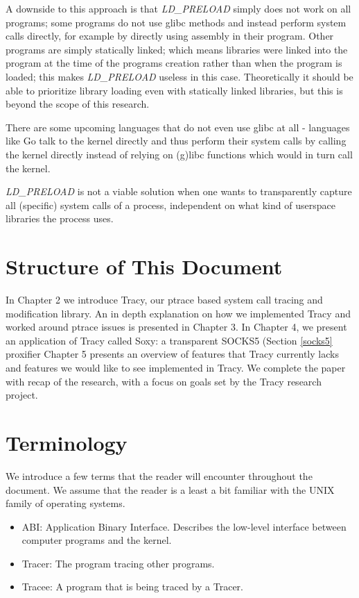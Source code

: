 \documentclass[a4paper, 10pt]{report}
\begin{document}
A downside to this approach is that \textit{LD\_PRELOAD} simply does not work
on all programs; some programs do not use glibc methods and instead perform
system calls directly, for example by directly using assembly in their program.
Other programs are simply statically linked; which means libraries were linked
into the program at the time of the programs creation rather than when the
program is loaded; this makes \textit{LD\_PRELOAD} useless in this case.
Theoretically it should be able to prioritize library loading even with
statically linked libraries, but this is beyond the scope of this research.

There are some upcoming languages that do not even use glibc at all - languages
like Go \cite{golang} talk to the kernel directly and thus perform their
system calls by calling the kernel directly instead of
relying on (g)libc functions which would in turn call the kernel.

\textit{LD\_PRELOAD} is not a viable solution when one wants to transparently capture
all (specific) system calls of a process, independent on what kind of
userspace libraries the process uses.

\section{Structure of This Document}

In Chapter 2 we introduce Tracy, our ptrace based system call tracing and
modification library. An in depth explanation on how we implemented Tracy and
worked around ptrace issues is presented in Chapter 3. In Chapter 4, we present
an application of Tracy called Soxy: a transparent SOCKS5 (Section \ref{socks5}
proxifier Chapter 5 presents an overview of features that Tracy currently lacks
and features we would like to see implemented in Tracy.
We complete the paper with recap of the research, with a focus on goals set by
the Tracy research project.

\section{Terminology}

We introduce a few terms that the reader will encounter throughout the
document. We assume that the reader is a least a bit familiar with the UNIX
family of operating systems.

\begin{itemize}
    \item ABI: Application Binary Interface. Describes the low-level interface
        between computer programs and the kernel.
    \item Tracer: The program tracing other programs.
    \item Tracee: A program that is being traced by a Tracer.
\end{itemize}
\end{document}
